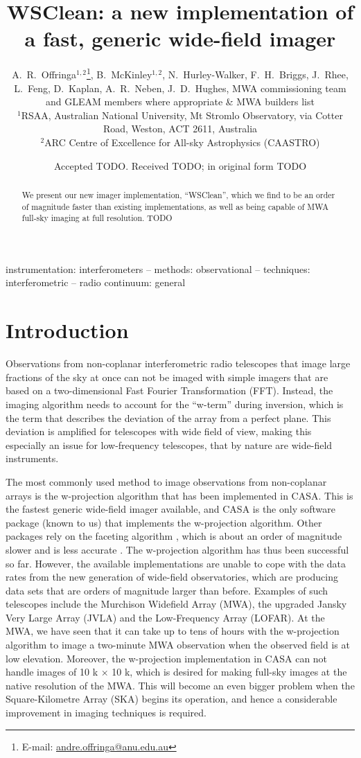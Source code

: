 \documentclass[useAMS,usenatbib]{mn2e}
\title[WSClean: a new imager]{WSClean: a new implementation of a fast, generic wide-field imager}
\author[A.~R.~Offringa et al.]{A.~R.~Offringa$^{1,2}$\thanks{E-mail:
\url{andre.offringa@anu.edu.au}}, B.~McKinley$^{1,2}$, N.~Hurley-Walker, 
F.~H.~Briggs, \newauthor
J.~Rhee, L.~Feng, D.~Kaplan, A.~R.~Neben, J.~D.~Hughes, MWA commissioning team\newauthor
and GLEAM members where appropriate \& MWA builders list
\\
$^{1}$RSAA, Australian National University, Mt Stromlo Observatory, via Cotter Road, Weston, ACT 2611, Australia \\
$^{2}$ARC Centre of Excellence for All-sky Astrophysics (CAASTRO) \\
}
\begin{document}
\date{Accepted TODO. Received TODO; in original form TODO}
\pagerange{\pageref{firstpage}--\pageref{lastpage}}

\label{firstpage}
\maketitle

\begin{abstract}
We present our new imager implementation, ``WSClean'', which we find to be an order of magnitude faster than existing implementations, as well as being capable of MWA full-sky imaging at full resolution.
TODO
\end{abstract}

\begin{keywords}
instrumentation: interferometers -- methods: observational -- techniques: interferometric -- radio continuum: general
\end{keywords}

\section{Introduction}

Observations from non-coplanar interferometric radio telescopes that image large fractions of the sky at once can not be imaged with simple imagers that are based on a two-dimensional Fast Fourier Transformation (FFT). Instead, the imaging algorithm needs to account for the ``w-term'' during inversion, which is the term that describes the deviation of the array from a perfect plane. This deviation is amplified for telescopes with wide field of view, making this especially an issue for low-frequency telescopes, that by nature are wide-field instruments.

The most commonly used method to image observations from non-coplanar arrays is the w-projection algorithm \citep{wprojection-cornwell} that has been implemented in CASA. This is the fastest generic wide-field imager available, and CASA is the only software package (known to us) that implements the w-projection algorithm. Other packages rely on the faceting algorithm \citep{facetting-cornwell}, which is about an order of magnitude slower and is less accurate \citep{wprojection-cornwell}. The w-projection algorithm has thus been successful so far. However, the available implementations are unable to cope with the data rates from the new generation of wide-field observatories, which are producing data sets that are orders of magnitude larger than before. Examples of such telescopes include the Murchison Widefield Array (MWA), the upgraded Jansky Very Large Array (JVLA) and the Low-Frequency Array (LOFAR). At the MWA, we have seen that it can take up to tens of hours with the w-projection algorithm to image a two-minute MWA observation when the observed field is at low elevation. Moreover, the w-projection implementation in CASA can not handle images of 10 k $\times$ 10 k, which is desired for making full-sky images at the native resolution of the MWA. This will become an even bigger problem when the Square-Kilometre Array (SKA) begins its operation, and hence a considerable improvement in imaging techniques is required.
\end{document}
